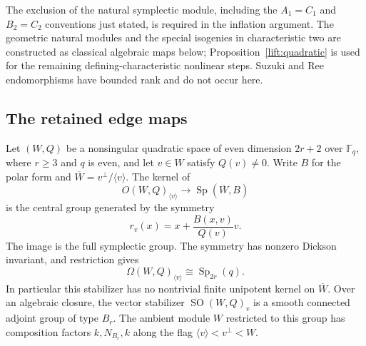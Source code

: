 \begin{remark}\label{lift:natural-exception}
The exclusion of the natural symplectic module, including the
$A_1=C_1$ and $B_2=C_2$ conventions just stated, is required in the
inflation argument.  The geometric natural modules and the special
isogenies in characteristic two are constructed as classical algebraic
maps below; Proposition~\ref{lift:quadratic} is used for the remaining
defining-characteristic nonlinear steps.  Suzuki and Ree endomorphisms
have bounded rank and do not occur here.
\end{remark}

\subsection{The retained edge maps}

\begin{lemma}\label{lift:nonsingular-line}
Let $(W,Q)$ be a nonsingular quadratic space of even dimension $2r+2$
over $\mathbb F_q$, where $r\geq3$ and $q$ is even, and let $v\in W$ satisfy
$Q(v)\neq0$.  Write $B$ for the polar form and $\overline W=v^\perp/\langle
v\rangle$.  The kernel of
\[
 O(W,Q)_{\langle v\rangle}\longrightarrow
 \operatorname{Sp}(\overline W,B)
\]
is the central group generated by the symmetry
\[
 r_v(x)=x+\frac{B(x,v)}{Q(v)}v.
\]
The image is the full symplectic group.  The symmetry has nonzero
Dickson invariant, and restriction gives
\[
 \Omega(W,Q)_{\langle v\rangle}
       \cong\operatorname{Sp}_{2r}(q).
\]
In particular this stabilizer has no nontrivial finite unipotent
kernel on $\overline W$.  Over an algebraic closure, the vector
stabilizer $\operatorname{SO}(W,Q)_v$ is a smooth connected adjoint
group of type $B_r$.  The ambient module $W$ restricted to this group has composition factors
$k,N_{B_r},k$ along the flag
$\langle v\rangle<v^\perp<W$.
\end{lemma}


